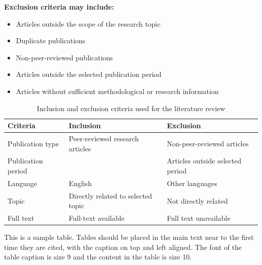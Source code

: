 \documentclass[12pt,a4paper]{article}
\begin{document}
\begin{justify}
\textbf{Exclusion criteria may include:}

\begin{itemize}
    \item Articles outside the scope of the research topic
    \item Duplicate publications
    \item Non-peer-reviewed publications
    \item Articles outside the selected publication period
    \item Articles without sufficient methodological or research information
\end{itemize}

\end{justify}


\begin{table}[H]
\caption{Inclusion and exclusion criteria used for the literature review}
\label{tab:inclusion-exclusion}

\fontsize{10pt}{12pt}\selectfont

\begin{tabular}{|p{4cm}|p{5cm}|p{5cm}|}
\hline
\centering\textbf{Criteria} &
\centering\textbf{Inclusion} &
\centering\textbf{Exclusion}
\tabularnewline
\hline

\centering Publication type &
\centering Peer-reviewed research articles &
\centering Non-peer-reviewed articles
\tabularnewline
\hline

\centering Publication period &
\centering [e.g., 2021--2026] &
\centering Articles outside selected period
\tabularnewline
\hline

\centering Language &
\centering English &
\centering Other languages
\tabularnewline
\hline

\centering Topic &
\centering Directly related to selected topic &
\centering Not directly related
\tabularnewline
\hline

\centering Full text &
\centering Full-text available &
\centering Full text unavailable
\tabularnewline
\hline

\end{tabular}

\end{table}

This is a sample table. Tables should be placed in the main text near to the first time they are cited, with the caption on top and left aligned. The font of the table caption is size 9 and the content in the table is size 10.
\end{document}
